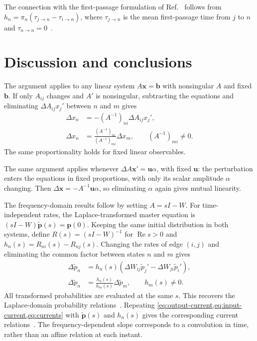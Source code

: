 \documentclass[
  reprint,
  superscriptaddress,
  amsmath,
  amssymb,
  aps,
  pre,
  longbibliography
]{revtex4-2}
\begin{document}
The connection with the first-passage formulation of
Ref.~\cite{Khodabandehlou2025} follows from
$h_n=\pi_n(\tau_{j\to n}-\tau_{i\to n})$, where
$\tau_{j\to n}$ is the mean first-passage time from $j$ to $n$
and $\tau_{n\to n}=0$~\cite{Meyer1975}.

\section{Discussion and conclusions}
\label{sec:discussion}

The argument applies to any linear
system $A\bm x=\bm b$ with nonsingular $A$ and fixed $\bm b$.
If only $A_{ij}$ changes and $A'$ is nonsingular, subtracting the
equations and eliminating $\Delta A_{ij}x_j'$ between $n$ and $m$ gives
\begin{align}
    \Delta x_n&=-(A^{-1})_{ni}\Delta A_{ij}x_j',\nonumber\\
    \Delta x_n&=\frac{(A^{-1})_{ni}}{(A^{-1})_{mi}}\Delta x_m,
    \qquad (A^{-1})_{mi}\ne0.
    \label{eq:linear-system}
\end{align}
The same proportionality holds for fixed linear observables.

The same argument applies whenever $\Delta A\bm x'=\bm u\alpha$,
with fixed $\bm u$: the perturbation enters the equations in fixed
proportions, with only its scalar amplitude $\alpha$ changing.
Then $\Delta\bm x=-A^{-1}\bm u\alpha$, so eliminating $\alpha$
again gives mutual linearity.

The frequency-domain results follow by setting $A=sI-W$.
For time-independent rates, the Laplace-transformed master equation is
$(sI-W)\widetilde{\bm p}(s)=\bm p(0)$.
Keeping the same initial distribution in both systems, define
$R(s)=(sI-W)^{-1}$ for $\operatorname{Re}s>0$ and
$h_n(s)=R_{ni}(s)-R_{nj}(s)$.
Changing the rates of edge $(i,j)$ and eliminating the common factor
between states $n$ and $m$ gives
\begin{align}
    \Delta\widetilde p_n
    &=h_n(s)(\Delta W_{ij}\widetilde p_j'
              -\Delta W_{ji}\widetilde p_i'),\nonumber\\
    \Delta\widetilde p_n
    &=\frac{h_n(s)}{h_m(s)}\Delta\widetilde p_m,
    \qquad h_m(s)\ne0.
    \label{eq:laplace}
\end{align}
All transformed probabilities are evaluated at the same $s$.
This recovers the Laplace-domain probability
relations~\cite{ZhengLu2026,VoitsSchwarz2026}.
Repeating \cref{eq:output-current,eq:input-current,eq:currents} with
$\widetilde{\bm p}(s)$ and $h_n(s)$ gives the corresponding current
relations~\cite{Harunari2024}.
The frequency-dependent slope corresponds to a convolution in time,
rather than an affine relation at each instant.


\end{document}
